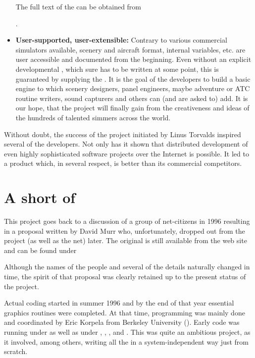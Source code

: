 \begin{itemize}
The full text of the  can be obtained from

.

\item\textbf{User-supported, user-extensible:}
   Contrary to various
  commercial simulators available, scenery and aircraft format,
  internal variables, etc. are user accessible and documented
  from the beginning. Even without an explicit developmental ,
  which sure has to be written at some point, this is guaranteed by supplying the
  . It is the goal of the developers to build a basic
  engine to which scenery designers, panel engineers, maybe adventure
  or ATC routine writers, sound capturers and others can (and are asked to)
  add. It is our hope, that the project will finally gain from the creativeness
  and ideas of the hundreds of talented simmers across the world.
\end{itemize}

  Without doubt, the success of the  project initiated by Linus
  Torvalds inspired several of the developers.
  Not only has it shown that distributed development of even highly sophisticated
  software projects over the Internet is possible. It led to a product which,
  in several respect, is better than its commercial competitors.


\section{A short  of \FlightGear}

This project goes back to a discussion of a group of net-citizens in 1996 resulting in a
proposal written by David Murr who, unfortunately, dropped out from
the project (as well as the net) later. The original  is still available
from the \FlightGear web site and can be found under


Although the names of the people and several of the details
naturally changed in time, the spirit of that proposal was clearly
retained up to the present status of the project.

Actual coding started in summer 1996 and by the end of that year essential graphics
routines were completed. At that time, programming was mainly done and coordinated by
Eric Korpela from Berkeley University
(). Early code was running under  as well as
under , , , and . This was
quite an ambitious project, as it involved, among others, writing all the  in a system-independent way just from scratch.

